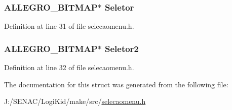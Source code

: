 \hypertarget{structlg_images_a1649a8fab3f526dc3c6668535fdb6a97}{
\subsubsection[{Seletor}]{\setlength{\rightskip}{0pt plus 5cm}A\-L\-L\-E\-G\-R\-O\-\_\-\-B\-I\-T\-M\-A\-P$\ast$ Seletor}}\label{structlg_images_a1649a8fab3f526dc3c6668535fdb6a97}


Definition at line 31 of file selecaomenu.\-h.

\hypertarget{structlg_images_a3098e23d8e3339d84485ad715e4e638a}{
\subsubsection[{Seletor2}]{\setlength{\rightskip}{0pt plus 5cm}A\-L\-L\-E\-G\-R\-O\-\_\-\-B\-I\-T\-M\-A\-P$\ast$ Seletor2}}\label{structlg_images_a3098e23d8e3339d84485ad715e4e638a}


Definition at line 32 of file selecaomenu.\-h.



The documentation for this struct was generated from the following file\-:\begin{DoxyCompactItemize}
\item 
J\-:/\-S\-E\-N\-A\-C/\-Logi\-Kid/make/src/\hyperlink{selecaomenu_8h}{selecaomenu.\-h}\end{DoxyCompactItemize}

